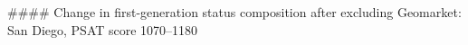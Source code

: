 #### Change in first-generation status composition after excluding Geomarket: San Diego, PSAT score 1070–1180
